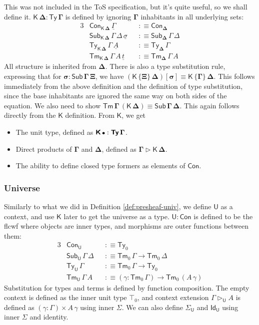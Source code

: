 \documentclass[12pt,a4paper,twoside,openany]{book}
\theoremstyle{remark}
\theoremstyle{definition}
\theoremstyle{theorem}
\newcommand{\bs}[1]{\boldsymbol{#1}}
\newcommand{\Con}{\mathsf{Con}}
\newcommand{\Sub}{\mathsf{Sub}}
\newcommand{\Tm}{\mathsf{Tm}}
\newcommand{\Ty}{\mathsf{Ty}}
\newcommand{\U}{\mathsf{U}}
\newcommand{\Id}{\mathsf{Id}}
\newcommand{\ext}{\triangleright}
\newcommand{\K}{\mathsf{K}}
\newcommand{\bCon}{\bs{\Con}}
\newcommand{\bTy}{\bs{\Ty}}
\newcommand{\bGamma}{\bs{\Gamma}}
\newcommand{\bDelta}{\bs{\Delta}}
\newcommand{\bemptycon}{\scaleobj{.75}{\bs{\bullet}}}
\newcommand{\bU}{\bs{\U}}
\newcommand{\bK}{\bs{\mathsf{K}}}
\newcommand{\ul}[1]{\underline{#1}}
\newcommand{\ulGamma}{\ul{\Gamma}}
\newcommand{\ulsigma}{\ul{\sigma}}
\newcommand{\ult}{\ul{t}}
\newcommand{\ulA}{\ul{A}}
\newcommand{\defn}{:\equiv}
\begin{document}
This was not included in the ToS specification, but it's quite useful, so we
shall define it. $\bs{\K\,\Delta : \Ty\,\Gamma}$ is defined by ignoring
$\bGamma$ inhabitants in all underlying sets:
\begin{alignat*}{3}
  & \Con_{\bs{\K\,\Delta}}\,\ulGamma &&\defn \Con_{\bDelta}\\
  & \Sub_{\bs{\K\,\Delta}}\,\Gamma\,\Delta\,\ulsigma &&\defn \Sub_{\bDelta}\,\Gamma\,\Delta\\
  &  \Ty_{\bs{\K\,\Delta}}\,\Gamma\,\ulA &&\defn \Ty_{\bDelta}\,\Gamma\\
  &  \Tm_{\bs{\K\,\Delta}}\,\Gamma\,A\,\ult &&\defn \Tm_{\bDelta}\,\Gamma\,A
\end{alignat*}
All structure is inherited from $\bDelta$. There is also a type substitution
rule, expressing that for $\bs{\sigma : \Sub\,\Gamma\,\Xi}$, we have
$\bs{(\K\,\{\Xi\}\,\Delta)[\sigma]} \equiv \bs{\K\,\{\Gamma\}\,\Delta}$. This
follows immediately from the above definition and the definition of type
substitution, since the base inhabitants are ignored the same way on both sides
of the equation. We also need to show $\bs{\Tm\,\Gamma\,(\K\,\Delta)} \equiv
\bs{\Sub\,\Gamma\,\Delta}$. This again follows directly from the $\bK$
definition. From $\bK$, we get
\begin{itemize}
\item The unit type, defined as $\bK\,\bemptycon : \bTy\,\bGamma$.
\item Direct products of $\bGamma$ and $\bDelta$, defined as $\bs{\Gamma \ext \K\,\Delta}$.
\item The ability to define closed type formers as elements of $\bCon$.
\end{itemize}

\subsubsection{Universe}

Similarly to what we did in Definition \ref{def:presheaf-univ}, we define $\bU$
as a context, and use $\bK$ later to get the universe as a type. $\bU :
\bCon$ is defined to be the flcwf where objects are inner types, and morphisms
are outer functions between them:
\begin{alignat*}{3}
  &\Con_{\bU} &&\defn \Ty_0 \\
  &\Sub_{\bU}\,\Gamma\,\Delta &&\defn \Tm_0\,\Gamma \to \Tm_0\,\Delta \\
  &\Ty_{\bU}\,\Gamma    &&\defn \Tm_0\,\Gamma \to \Ty_0\\
  &\Tm_{\bU}\,\Gamma\,A &&\defn (\gamma : \Tm_0\,\Gamma) \to \Tm_0\,(A\,\gamma)
\end{alignat*}
Substitution for types and terms is defined by function composition. The empty
context is defined as the inner unit type $\top_0$, and context extension
$\Gamma \ext_{\bU} A$ is defined as $(\gamma : \Gamma) \times A\,\gamma$ using
inner $\Sigma$. We can also define $\Sigma_{\bU}$ and $\Id_{\bU}$ using inner
$\Sigma$ and identity.
\end{document}
